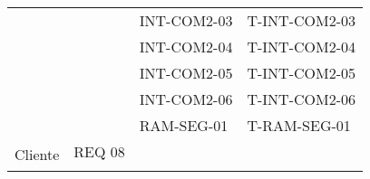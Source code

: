 \begin{table}[H]
\begin{tabular}{|l|l|ll|}
                                                       &                                                                                                                                                                                                                                                        & INT-COM2-03                                           & T-INT-COM2-03                                          \\
                                                       &                                                                                                                                                                                                                                                        & INT-COM2-04                                           & T-INT-COM2-04                                          \\
                                                       &                                                                                                                                                                                                                                                        & INT-COM2-05                                           & T-INT-COM2-05                                          \\
                                                       &                                                                                                                                                                                                                                                        & INT-COM2-06                                           & T-INT-COM2-06                                          \\
                                                       &                                                                                                                                                                                                                                                        & RAM-SEG-01                                            & T-RAM-SEG-01                                           \\ \hline
\multirow{2}{*}{Cliente}                               & REQ 08                                                                                                                                                                                                                                                 &                                                       &                                                        \\ \cline{2-2}

\end{tabular}
\end{table}
